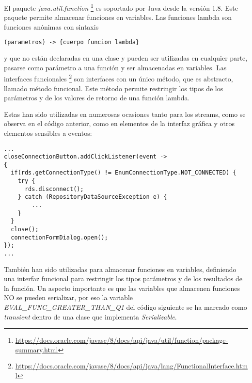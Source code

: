 El paquete \textit{java.util.function} \footnote{\url{https://docs.oracle.com/javase/8/docs/api/java/util/function/package-summary.html}} es soportado por Java desde la versión 1.8. Este paquete permite almacenar funciones en variables. Las funciones lambda son funciones anónimas con sintaxis 
\begin{minipage}{\linewidth}
{\tiny
\begin{lstlisting}
(parametros) -> {cuerpo funcion lambda}
\end{lstlisting}
}
\end{minipage}
y que no están declaradas en una clase y pueden ser utilizadas en cualquier parte, pasarse como parámetro a una función y ser almacenadas en variables. Las interfaces funcionales \footnote{\url{https://docs.oracle.com/javase/8/docs/api/java/lang/FunctionalInterface.html}} son interfaces con un único método, que es abstracto, llamado método funcional. Este método permite restringir los tipos de los parámetros y de los valores de retorno de una función lambda.

Estas han sido utilizadas en numerosas ocasiones tanto para los streams, como se observa en el código anterior, como en elementos de la interfaz gráfica y otros elementos sensibles a eventos:\\
\begin{minipage}{\linewidth}
{\tiny
\begin{lstlisting}[breaklines]
...
closeConnectionButton.addClickListener(event ->  
{
  if(rds.getConnectionType() != EnumConnectionType.NOT_CONNECTED) {
	try {
	  rds.disconnect();
	} catch (RepositoryDataSourceException e) {
		...
	}
  }
  close();
  connectionFormDialog.open();
});
...
\end{lstlisting}
}
\end{minipage}

También han sido utilizadas para almacenar funciones en variables, definiendo una interfaz funcional para restringir los tipos parámetros y de los resultados de la función. Un aspecto importante es que las variables que almacenen funciones NO se pueden serializar, por eso la variable \textit{EVAL\_FUNC\_GREATER\_THAN\_Q1} del código siguiente se ha marcado como \textit{transient} dentro de una clase que implementa \textit{Serializable}.

